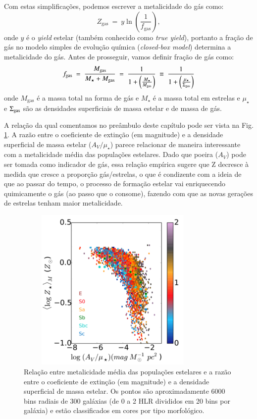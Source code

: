 Com estas simplificações, podemos escrever a metalicidade do gás como:
\begin{equation}
	Z_{\mathrm{gas}}\ =\ y \ln \left(\frac{1}{f_{\mathrm{gas}}}\right),
	\label{eq:Zgas_closedbox}
\end{equation}
\noindent onde $y$ é o {\em yield} estelar (também conhecido como {\em true yield}), portanto a
fração de gás no modelo simples de evolução química ({\em closed-box model}) determina a
metalicidade do gás. Antes de prosseguir, vamos definir fração de gás como:
\begin{equation}
	f_{\mathrm{gas}}\ =\ \frac{M_{\mathrm{gas}}}{M_\star + M_{\mathrm{gas}}}\ =\ \frac{1}{1 +
	\left(\frac{M_\star}{M_{\mathrm{gas}}}\right)}\ \equiv\ \frac{1}{1 +
	\left(\frac{\mu_\star}{\SigmaGas}\right)}
	\label{eq:fgas}
\end{equation}
\noindent onde $M_{\mathrm{gas}}$ é a massa total na forma de gás e $M_\star$ é a massa total em
estrelas e $\mu_\star$ e $\Sigma_{\mathrm{gas}}$ são as densidades superficiais de massa estelar e de massa de
gás.

A relação da qual comentamos no preâmbulo deste capítulo pode ser vista na Fig.
\ref{fig:dust2stars}. A razão entre o coeficiente de extinção (em magnitude) e a densidade
superficial de massa estelar ($A_V / \mu_\star$) parece relacionar de maneira interessante com a
metalicidade média das populações estelares. Dado que poeira ($A_V$) pode ser tomada como indicador
de gás, essa relação empírica sugere que Z decresce à medida que cresce a proporção gás/estrelas, o
que é condizente com a ideia de que ao passar do tempo, o processo de formação estelar vai
enriquecendo quimicamente o gás (ao passo que o consome), fazendo com que as novas gerações de
estrelas tenham maior metalicidade.
 
\begin{figure}
	\centering
	\includegraphics[height = 8cm, width = 9.5cm]{figuras/dust2stars.pdf}
	\caption[$A_V / \mu_\star$ vs. ]
	{Relação entre metalicidade média das populações estelares e a razão entre o coeficiente de
extinção (em magnitude) e a densidade superficial de massa estelar. Os pontos são aproximadamente
6000 bins radiais de 300 galáxias (de 0 a 2 HLR divididos em 20 bins por galáxia) e estão
classificados em cores por tipo morfológico.}
	\label{fig:dust2stars}
\end{figure} 

